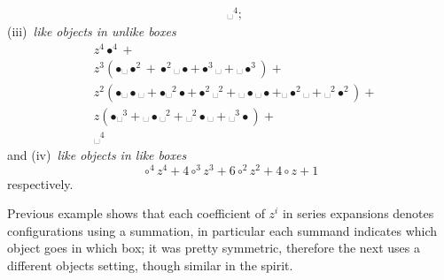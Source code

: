 \begin{example}
\begin{displaymath}
\begin{split}
&␣^{4};
\end{split}
\end{displaymath}
(iii)~\textit{like objects in unlike boxes}
\begin{displaymath}
\begin{split}
&z^{4} \bullet^{4} + \\
&z^{3} \left(\bullet ␣ \bullet^{2} + \bullet^{2} ␣ \bullet + \bullet^{3} ␣ + ␣ \bullet^{3}\right) + \\
&z^{2} \left(\bullet ␣ \bullet ␣ + \bullet ␣^{2} \bullet + \bullet^{2} ␣^{2} + ␣ \bullet ␣ \bullet + ␣ \bullet^{2} ␣ + ␣^{2} \bullet^{2}\right) + \\
&z \left(\bullet ␣^{3} + ␣ \bullet ␣^{2} + ␣^{2} \bullet ␣ + ␣^{3} \bullet\right) +\\
&␣^{4}
\end{split}
\end{displaymath}
and (iv)~\textit{like objects in like boxes}
\begin{displaymath}
\circ^{4} z^{4} + 4 \circ^{3} z^{3} + 6 \circ^{2} z^{2} + 4 \circ z + 1
\end{displaymath}
respectively.
\end{example}

Previous example shows that each coefficient of $z^{i}$ in series expansions
denotes configurations using a summation, in particular each summand indicates
which object goes in which box; it was pretty symmetric, therefore the next
uses a different objects setting, though similar in the spirit.


